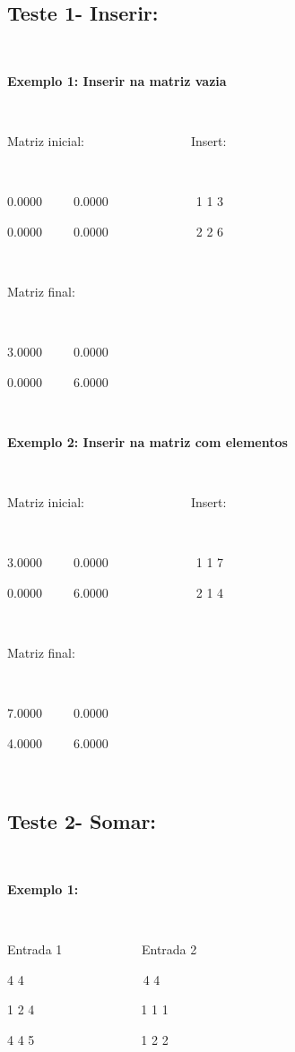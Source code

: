 \documentclass{article}
\begin{document}
\subsection{Teste 1- Inserir:}

~~~~~~~~~~~~~~~

\textbf{Exemplo 1: Inserir na matriz vazia}

~~~~~~~~~~~~~~~

Matriz inicial:~~~~~~~~~~~~~~~~~Insert:

~~~~~~~~~~~~~~~

0.0000~~~~~0.0000~~~~~~~~~~~~~~1 1 3

0.0000~~~~~0.0000~~~~~~~~~~~~~~2 2 6

~~~~~~~~~~~~~~

Matriz final:

~~~~~~~~~~~~~~

3.0000~~~~~0.0000

0.0000~~~~~6.0000

~~~~~~~~~~~~~~~

\textbf{Exemplo 2: Inserir na matriz com elementos}

~~~~~~~~~~~~~~~

Matriz inicial:~~~~~~~~~~~~~~~~~Insert:

~~~~~~~~~~~~~~~

3.0000~~~~~0.0000~~~~~~~~~~~~~~1 1 7

0.0000~~~~~6.0000~~~~~~~~~~~~~~2 1 4

~~~~~~~~~~~~~~

Matriz final:

~~~~~~~~~~~~~~

7.0000~~~~~0.0000

4.0000~~~~~6.0000

~~~~~~~~~~~~~~~



\subsection{Teste 2- Somar:}

~~~~~~~~~~~~~~~~~~~~~~~~~~

\textbf{Exemplo 1:}

~~~~~~~~~~~~~~~~~~~~~~~~~~

Entrada 1 ~~~~~~~~~~~~Entrada 2 

4 4~~~~~~~~~~~~~~~~~~~4 4

1 2 4~~~~~~~~~~~~~~~~~1 1 1                 

4 4 5~~~~~~~~~~~~~~~~~1 2 2
\end{document}
